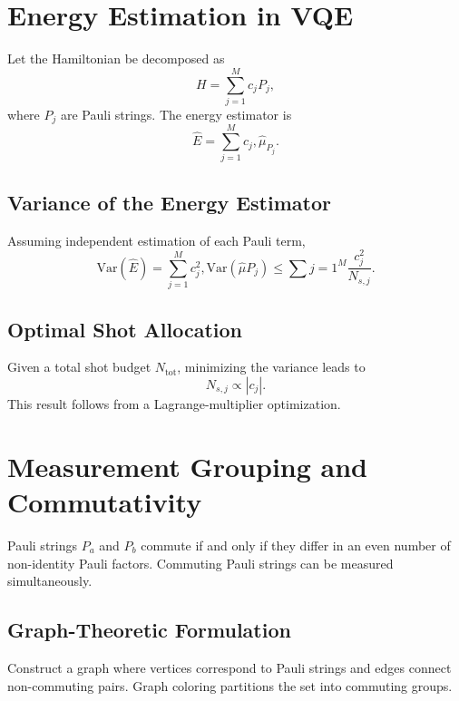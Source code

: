 \documentclass{book}
\begin{document}
\section{Energy Estimation in VQE}

Let the Hamiltonian be decomposed as
\begin{equation}
H = \sum_{j=1}^M c_j P_j,
\end{equation}
where $P_j$ are Pauli strings. The energy estimator is
\begin{equation}
\hat{E} = \sum_{j=1}^M c_j , \hat{\mu}_{P_j}.
\end{equation}

\subsection{Variance of the Energy Estimator}

Assuming independent estimation of each Pauli term,
\begin{equation}
\mathrm{Var}(\hat{E}) = \sum_{j=1}^M c_j^2 , \mathrm{Var}(\hat{\mu}{P_j}) \le \sum{j=1}^M \frac{c_j^2}{N_{s,j}}.
\end{equation}

\subsection{Optimal Shot Allocation}

Given a total shot budget $N_\mathrm{tot}$, minimizing the variance leads to
\begin{equation}
N_{s,j} \propto |c_j|.
\end{equation}
This result follows from a Lagrange-multiplier optimization.

\section{Measurement Grouping and Commutativity}

Pauli strings $P_a$ and $P_b$ commute if and only if they differ in an even number of non-identity Pauli factors. Commuting Pauli strings can be measured simultaneously.

\subsection{Graph-Theoretic Formulation}

Construct a graph where vertices correspond to Pauli strings and edges connect non-commuting pairs. Graph coloring partitions the set into commuting groups.
\end{document}
